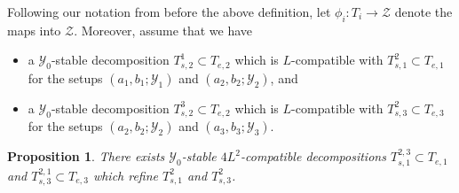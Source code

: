 \documentclass{amsart}
\newtheorem{proposition}[theorem]{Proposition}
\theoremstyle{definition}
\theoremstyle{remark}
\theoremstyle{definition}
\newcommand{\calY}{\mathcal{Y}}
\newcommand{\calZ}{\mathcal{Z}}
\begin{document}
Following our notation from before the above definition, let $\phi_i:T_i \to \calZ$ denote the maps into $\calZ$.  Moreover, assume that we have
\begin{itemize}
\item a $\calY_0$-stable decomposition $T^1_{s,2} \subset T_{e,2}$ which is $L$-compatible with $T^2_{s,1} \subset T_{e,1} $ for the setups $(a_1,b_1;\calY_1)$ and $(a_2,b_2;\calY_2)$, and
\item a $\calY_0$-stable decomposition $T^3_{s,2} \subset T_{e,2}$ which is $L$-compatible with $T^2_{s,3} \subset T_{e,3}$ for the setups $(a_2,b_2;\calY_2)$ and $(a_3,b_3;\calY_3)$.
\end{itemize}

\begin{proposition}\label{prop:stable iteration, pair}
There exists $\calY_0$-stable $4L^2$-compatible decompositions $T^{2,3}_{s,1} \subset T_{e,1}$ and $T^{2,1}_{s,3} \subset T_{e,3}$ which refine $T^2_{s,1}$ and $T^2_{s,3}$. 
\end{proposition}
\end{document}
